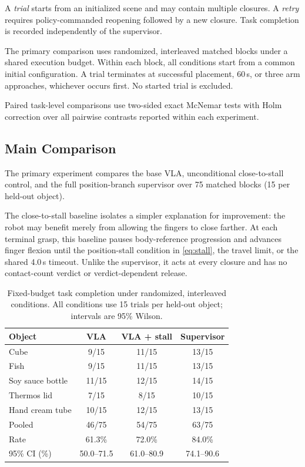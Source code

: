 \documentclass[letterpaper,10pt,conference]{ieeeconf}
\begin{document}
A \emph{trial} starts from an initialized scene and may contain multiple
closures. A \emph{retry} requires policy-commanded reopening followed by a new
closure. Task completion is recorded independently of the supervisor.

The primary comparison uses randomized, interleaved matched blocks under a
shared execution budget. Within each block, all conditions start from a common
initial configuration. A trial terminates at successful placement, 60\,s, or
three arm approaches, whichever occurs first. No started trial is excluded.

Paired task-level comparisons use two-sided exact McNemar tests with Holm
correction over all pairwise contrasts reported within each experiment.


\subsection{Main Comparison}
\label{sec:controlled}

The primary experiment compares the base VLA, unconditional close-to-stall
control, and the full position-branch supervisor over 75 matched blocks
(15 per held-out object).

The close-to-stall baseline isolates a simpler explanation for improvement:
the robot may benefit merely from allowing the fingers to close farther. At
each terminal grasp, this baseline pauses body-reference progression and
advances finger flexion until the position-stall condition in
\eqref{eq:stall}, the travel limit, or the shared 4.0\,s timeout. Unlike the
supervisor, it acts at every closure and has no contact-count verdict or
verdict-dependent release.

\begin{table}[H]
\vspace{-4mm}
\caption{Fixed-budget task completion under randomized, interleaved conditions.
All conditions use 15 trials per held-out object; intervals are 95\% Wilson.}
\label{tab:controlled}
\centering\small
\setlength{\tabcolsep}{3pt}
\begin{tabularx}{\columnwidth}{Yccc}
\toprule
Object & VLA & VLA + stall & Supervisor\\
\midrule
Cube             & 9/15  & 11/15 & 13/15\\
Fish             & 9/15  & 11/15 & 13/15\\
Soy sauce bottle & 11/15 & 12/15 & 14/15\\
Thermos lid      & 7/15  & 8/15  & 10/15\\
Hand cream tube  & 10/15 & 12/15 & 13/15\\
\midrule
Pooled            & 46/75 & 54/75 & 63/75\\
Rate              & 61.3\% & 72.0\% & 84.0\%\\
95\% CI (\%)      & 50.0--71.5 & 61.0--80.9 & 74.1--90.6\\
\bottomrule
\end{tabularx}
\end{table}
\end{document}
